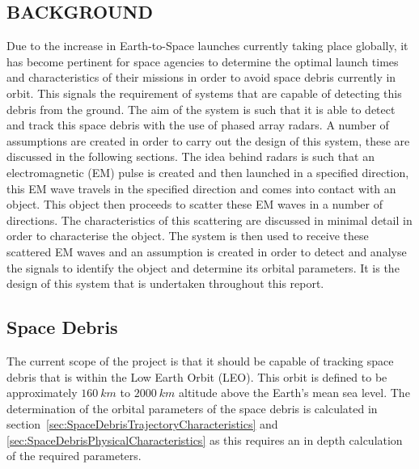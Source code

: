 \documentclass[11pt]{witseiepaper}
\begin{document}
\begin{bibunit}[witseie]


\subsection{BACKGROUND} \label{sec:Background}
Due to the increase in Earth-to-Space launches currently taking place globally, it has become pertinent for space agencies to determine the optimal launch times and characteristics of their missions in order to avoid space debris currently in orbit. This signals the requirement of systems that are capable of detecting this debris from the ground.
The aim of the system is such that it is able to detect and track this space debris with the use of phased array radars.
A number of assumptions are created in order to carry out the design of this system, these are discussed in the following sections.
The idea behind radars is such that an electromagnetic (EM) pulse is created and then launched in a specified direction, this EM wave travels in the specified direction and comes into contact with an object. This object then proceeds to scatter these EM waves in a number of directions. The characteristics of this scattering are discussed in minimal detail in order to characterise the object. 
The system is then used to receive these scattered EM waves and an assumption is created in order to detect and analyse the signals to identify the object and determine its orbital parameters.
It is the design of this system that is undertaken throughout this report. 

\subsection{Space Debris} \label{sec:SpaceDebris}
The current scope of the project is that it should be capable of tracking space debris that is within the Low Earth Orbit (LEO). This orbit is defined to be approximately $160~km$ to $2000~km$ altitude above the Earth's mean sea level. 
The determination of the orbital parameters of the space debris is calculated in section~\ref{sec:SpaceDebrisTrajectoryCharacteristics} and \ref{sec:SpaceDebrisPhysicalCharacteristics} as this requires an in depth calculation of the required parameters.


\end{bibunit}
\end{document}
